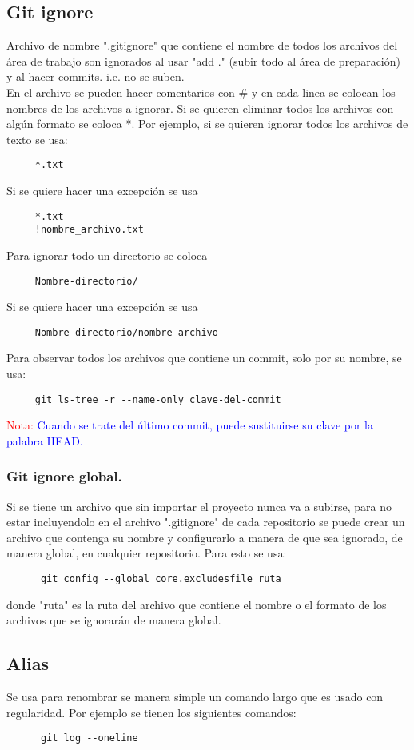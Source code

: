 \documentclass[10pt,oneside]{article}
\begin{document}
\begin{multicols}{2}
 \subsection{Git ignore}
 Archivo de nombre ".gitignore" que contiene el nombre de todos los archivos del área de trabajo son ignorados al usar "add ." (subir todo al área de preparación) y al hacer commits. i.e. no se suben. \\ \newline En el archivo se pueden hacer comentarios con \# y en cada linea se colocan los nombres de los archivos a ignorar. Si se quieren eliminar todos los archivos con algún formato se coloca *. Por ejemplo, si se quieren ignorar todos los archivos de texto se usa: \begin{verbatim}
     *.txt
 \end{verbatim}
 Si se quiere hacer una excepción se usa
  \begin{verbatim}
     *.txt
     !nombre_archivo.txt
 \end{verbatim}
Para ignorar todo un directorio se coloca 
\begin{verbatim}
     Nombre-directorio/
 \end{verbatim}
 Si se quiere hacer una excepción se usa
  \begin{verbatim}
     Nombre-directorio/nombre-archivo
 \end{verbatim}
 Para observar todos los archivos que contiene un commit, solo por su nombre, se usa:
 \begin{verbatim}
     git ls-tree -r --name-only clave-del-commit
 \end{verbatim}
 \textcolor{red}{Nota:} \textcolor{blue}{Cuando se trate del último commit, puede sustituirse su clave por la palabra HEAD.}
  \subsubsection{Git ignore global.} Si se tiene un archivo que sin importar el proyecto nunca va a subirse, para no estar incluyendolo en el archivo ".gitignore" de cada repositorio se puede crear un archivo que contenga su nombre y configurarlo a manera de que sea ignorado, de manera global, en cualquier repositorio. Para esto se usa: \begin{verbatim}
      git config --global core.excludesfile ruta
  \end{verbatim}
  donde "ruta" es la ruta del archivo que contiene el nombre o el formato de los archivos que se ignorarán de manera global.
  \subsection{Alias} Se usa para renombrar se manera simple un comando largo que es usado con regularidad. Por ejemplo se tienen los siguientes comandos:\begin{verbatim}
      git log --oneline
      

\end{verbatim}
\end{multicols}
\end{document}
